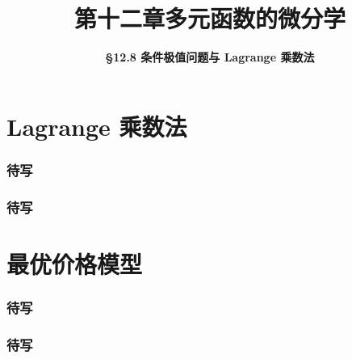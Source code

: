\everymath{\displaystyle}



\title[第十二章\\
多元微分学]{\texorpdfstring{\LARGE \bfseries 第十二章\quad 多元函数的微分学}{第十二章 多元函数的微分学}} %
\author[\smaller \S 12.7\\
条件极值与 Lagrange 乘数法] %
{\Large \bfseries \S 12.8 条件极值问题与 Lagrange 乘数法}
\date{}





\begin{frame}

\titlepage %

\end{frame}



\section{Lagrange 乘数法}


\begin{frame}
\frametitle{待写}

\end{frame}


\begin{frame}
\frametitle{待写}

\end{frame}


\section{最优价格模型}


\begin{frame}
\frametitle{待写}

\end{frame}


\begin{frame}
\frametitle{待写}

\end{frame}



